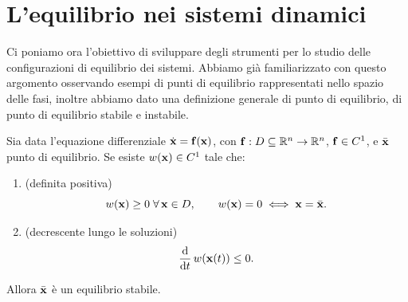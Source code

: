 \chapter{L'equilibrio nei sistemi dinamici}
Ci poniamo ora l'obiettivo di sviluppare degli strumenti per lo studio delle configurazioni di equilibrio dei sistemi. Abbiamo già familiarizzato con questo argomento osservando esempi di punti di equilibrio rappresentati nello spazio delle fasi, inoltre abbiamo dato una definizione generale di punto di equilibrio, di punto di equilibrio stabile e instabile.

\begin{theorem}[Lyapunov]
Sia data l'equazione differenziale $\dot{\mathbf{x}}=\mathbf{f}(\mathbf{x})$, con $\mathbf{f}:D\subseteq\mathbb{R}^n\to\mathbb{R}^n$, $\mathbf{f}\in C^1$, e $\bar{\mathbf{x}}$ punto di equilibrio.
Se esiste $w(\mathbf{x})\in C^1$ tale che:
\begin{enumerate}
  \item (definita positiva) 
  \begin{equation}
    w(\mathbf{x})\ge 0 \;\forall\,\mathbf{x}\in D, \qquad w(\mathbf{x})=0 \iff \mathbf{x}=\bar{\mathbf{x}}.
  \end{equation}
  \item (decrescente lungo le soluzioni)
  \begin{equation}
    \frac{\mathrm{d}}{\mathrm{d}t}\, w(\mathbf{x}(t)) \le 0 .
  \end{equation}
\end{enumerate}
Allora $\bar{\mathbf{x}}$ è un equilibrio stabile.
\end{theorem}

